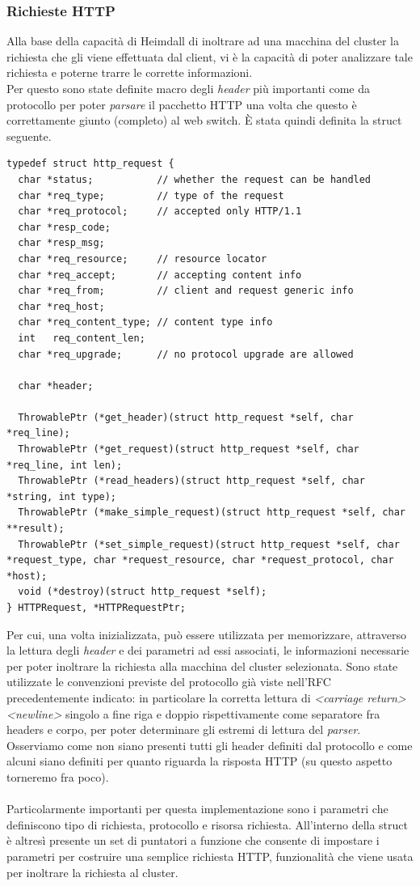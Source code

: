 \documentclass[italian]{tktltiki2}
\begin{document}
\subsubsection*{Richieste HTTP}
Alla base della capacità di Heimdall di inoltrare ad una macchina del cluster la richiesta che gli viene effettuata dal client, vi è la capacità di poter analizzare tale richiesta e poterne trarre le corrette informazioni. \\
Per questo sono state definite macro degli \emph{header} più importanti come da protocollo\cite{http_1.1} per poter \emph{parsare} il pacchetto HTTP una volta che questo è correttamente giunto (completo) al web switch. È stata quindi definita la struct seguente.
\begin{lstlisting}
typedef struct http_request {
  char *status;           // whether the request can be handled
  char *req_type;         // type of the request
  char *req_protocol;     // accepted only HTTP/1.1
  char *resp_code;
  char *resp_msg;
  char *req_resource;     // resource locator
  char *req_accept;       // accepting content info
  char *req_from;         // client and request generic info
  char *req_host;
  char *req_content_type; // content type info
  int   req_content_len;
  char *req_upgrade;      // no protocol upgrade are allowed

  char *header;                                

  ThrowablePtr (*get_header)(struct http_request *self, char *req_line);
  ThrowablePtr (*get_request)(struct http_request *self, char *req_line, int len);
  ThrowablePtr (*read_headers)(struct http_request *self, char *string, int type);
  ThrowablePtr (*make_simple_request)(struct http_request *self, char **result);
  ThrowablePtr (*set_simple_request)(struct http_request *self, char *request_type, char *request_resource, char *request_protocol, char *host);
  void (*destroy)(struct http_request *self);
} HTTPRequest, *HTTPRequestPtr;

\end{lstlisting}
Per cui, una volta inizializzata, può essere utilizzata per memorizzare, attraverso la lettura degli \emph{header} e dei parametri ad essi associati, le informazioni necessarie per poter inoltrare la richiesta alla macchina del cluster selezionata. Sono state utilizzate le convenzioni previste del protocollo già viste nell'RFC precedentemente indicato: in particolare la corretta lettura di \emph{<carriage return><newline>} singolo a fine riga e doppio rispettivamente come separatore fra headers e corpo, per poter determinare gli estremi di lettura del \emph{parser}.
\\ 
Osserviamo come non siano presenti tutti gli header definiti dal protocollo e come alcuni siano definiti per quanto riguarda la risposta HTTP (su questo aspetto torneremo fra poco). 
\\
\\
Particolarmente importanti per questa implementazione sono i parametri che definiscono tipo di richiesta, protocollo e risorsa richiesta. All'interno della struct è altresì presente un set di puntatori a funzione che consente di impostare i parametri per costruire una semplice richiesta HTTP, funzionalità che viene usata per inoltrare la richiesta al cluster.
\end{document}
